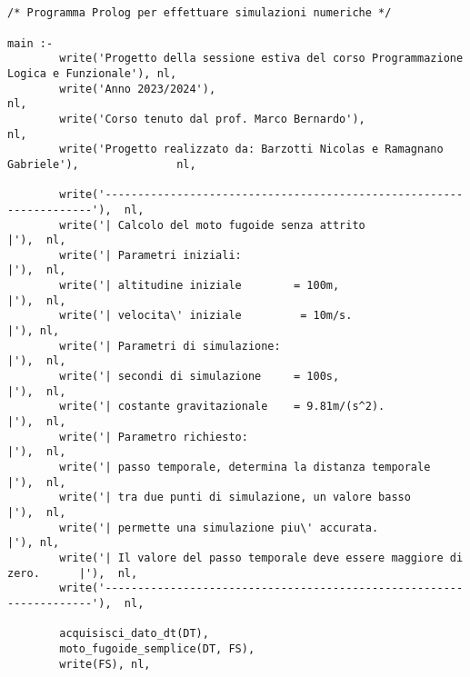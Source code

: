 
\scriptsize
\begin{verbatim}
   

/* Programma Prolog per effettuare simulazioni numeriche */

main :- 
        write('Progetto della sessione estiva del corso Programmazione Logica e Funzionale'), nl,
        write('Anno 2023/2024'),                                                              nl,
        write('Corso tenuto dal prof. Marco Bernardo'),                                       nl,
        write('Progetto realizzato da: Barzotti Nicolas e Ramagnano Gabriele'),               nl, 

        write('--------------------------------------------------------------------'),  nl,
        write('| Calcolo del moto fugoide senza attrito                           |'),  nl,
        write('| Parametri iniziali:                                              |'),  nl,
        write('| altitudine iniziale        = 100m,                               |'),  nl,
        write('| velocita\' iniziale         = 10m/s.                              |'), nl,
        write('| Parametri di simulazione:                                        |'),  nl,
        write('| secondi di simulazione     = 100s,                               |'),  nl,
        write('| costante gravitazionale    = 9.81m/(s^2).                        |'),  nl,
        write('| Parametro richiesto:                                             |'),  nl,
        write('| passo temporale, determina la distanza temporale                 |'),  nl,
        write('| tra due punti di simulazione, un valore basso                    |'),  nl,
        write('| permette una simulazione piu\' accurata.                          |'), nl,
        write('| Il valore del passo temporale deve essere maggiore di zero.      |'),  nl,
        write('--------------------------------------------------------------------'),  nl,

        acquisisci_dato_dt(DT),                                                        
        moto_fugoide_semplice(DT, FS),
        write(FS), nl,


\end{verbatim}
